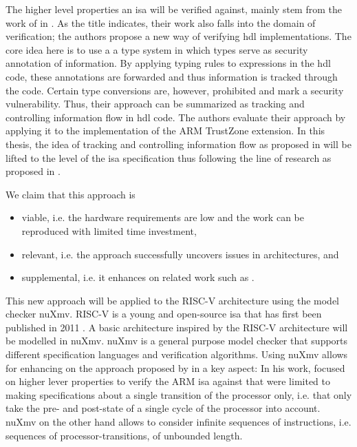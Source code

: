 The higher level properties an \gls{isa} will be verified against, mainly stem from the work of \citeauthor{Ferraiuolo17} in  \cite{Ferraiuolo17}.
As the title indicates, their work also falls into the domain of verification; the authors propose a new way of verifying \gls{hdl} implementations.
The core idea here is to use a a type system in which types serve as security annotation of information.
By applying typing rules to expressions in the \gls{hdl} code, these annotations are forwarded and thus information is tracked through the code.
Certain type conversions are, however, prohibited and mark a security vulnerability.
Thus, their approach can be summarized as tracking and controlling information flow in \gls{hdl} code.
The authors evaluate their approach by applying it to the implementation of the ARM TrustZone extension.
In this thesis, the idea of tracking and controlling information flow as proposed in \cite{Ferraiuolo17} will be lifted to the level of the \gls{isa} specification thus following the line of research as proposed in \cite{Reid17}.

We claim that this approach is
\begin{itemize}
    \item viable, i.e. the hardware requirements are low and the work can be reproduced with limited time investment,
    \item relevant, i.e. the approach successfully uncovers issues in architectures, and
    \item supplemental, i.e. it enhances on related work such as \cite{Reid17}.
\end{itemize}

This new approach will be applied to the RISC-V architecture using the model checker nuXmv.
RISC-V is a young and open-source \gls{isa} that has first been published in 2011 \cite{RiscVISA-org}.
A basic architecture inspired by the RISC-V architecture will be modelled in nuXmv.
nuXmv is a general purpose model checker that supports different specification languages and verification algorithms.
Using nuXmv allows for enhancing on the approach proposed by \citeauthor{Reid17} in a key aspect:
In his work, \citeauthor{Reid17} focused on higher lever properties to verify the ARM \gls{isa} against that were limited to making specifications about a single transition of the processor only, i.e. that only take the pre- and post-state of a single cycle of the processor into account.
nuXmv on the other hand allows to consider infinite sequences of instructions, i.e. sequences of processor-transitions, of unbounded length.

